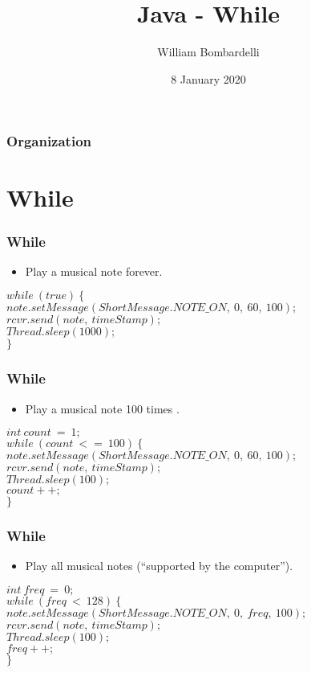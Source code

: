 \documentclass{beamer}
\title[Java]{Java - While}
\author[W. Bombardelli]{William Bombardelli}
\institute[Schweizerschule Mexiko]
{
	\vskip 12pt
	Schweizerschule Mexiko, Ciudad de México, Mexico \\
	\texttt{\url{https://github.com/wbombardellis/java-unterricht}}
}
\date{8 January 2020}
\newcommand{\cindent}{\hskip20pt}
\begin{document}
	\begin{frame}
		\titlepage
	\end{frame}
	
	\begin{frame}
		\frametitle{Organization}
		\tableofcontents
	\end{frame}

	\section{While}
	\begin{frame}
		\frametitle{While}
		\begin{itemize}
			\item Play a musical note forever.
		\end{itemize}
		\pause
		$while\ (true)\ \{$\\
			\cindent $note.setMessage(ShortMessage.NOTE\_ON,\ 0,\ 60,\ 100);$\\
			\cindent $rcvr.send(note,\ timeStamp);$\\
			\cindent $Thread.sleep(1000);$\\
		$\}$\\
	\end{frame}

	\begin{frame}
		\frametitle{While}
		\begin{itemize}
			\item Play a musical note 100 times	.
		\end{itemize}
		\pause
		$int\ count\ =\ 1;$\\
		$while\ (count\ <=\ 100)\ \{$\\
			\cindent $note.setMessage(ShortMessage.NOTE\_ON,\ 0,\ 60,\ 100);$\\
			\cindent $rcvr.send(note,\ timeStamp);$\\
			\cindent $Thread.sleep(100);$\\
			\cindent $count++;$\\
		$\}$\\
	\end{frame}

	\begin{frame}
		\frametitle{While}
		\begin{itemize}
			\item Play all musical notes (``supported by the computer'').
		\end{itemize}
		\pause
		$int\ freq\ =\ 0;$\\
		$while\ (freq\ <\ 128)\ \{$\\
			\cindent $note.setMessage(ShortMessage.NOTE\_ON,\ 0,\ freq,\ 100);$\\
			\cindent $rcvr.send(note,\ timeStamp);$\\
			\cindent $Thread.sleep(100);$\\
			\cindent $freq++;$\\
		$\}$\\
	\end{frame}
\end{document}
